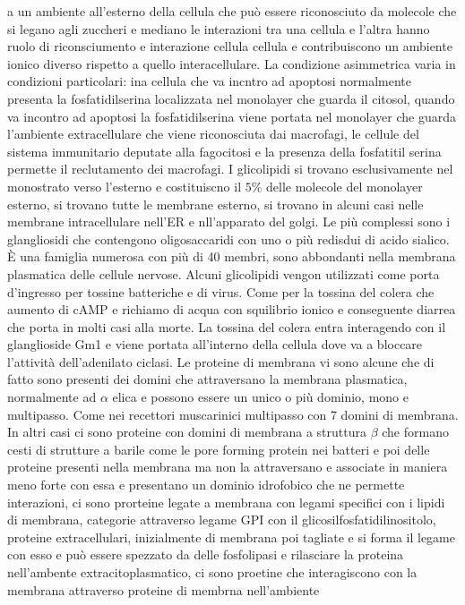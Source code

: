 a un ambiente all'esterno della cellula che pu\`o essere riconosciuto da molecole che si legano agli zuccheri e mediano le interazioni tra una cellula e l'altra hanno ruolo di 
riconsciumento e interazione cellula cellula e contribuiscono un ambiente ionico diverso rispetto a quello interacellulare. La condizione asimmetrica varia in condizioni particolari:
ina cellula che va incntro ad apoptosi normalmente presenta la fosfatidilserina localizzata nel monolayer che guarda il citosol, quando va incontro ad apoptosi la fosfatidilserina viene
portata nel monolayer che guarda l'ambiente extracellulare che viene riconosciuta dai macrofagi, le cellule del sistema immunitario deputate alla fagocitosi e la presenza della fosfatitil
serina permette il reclutamento dei macrofagi. I glicolipidi si trovano esclusivamente nel monostrato verso l'esterno e costituiscno il $5\%$ delle molecole del monolayer esterno, si 
trovano tutte le membrane esterno, si trovano in alcuni casi nelle membrane intracellulare nell'ER e nll'apparato del golgi. Le pi\`u complessi sono i glangliosidi che contengono 
oligosaccaridi con uno o pi\`u redisdui di acido sialico. \`E una famiglia numerosa con pi\`u di 40 membri, sono abbondanti nella membrana plasmatica delle cellule nervose. Alcuni 
glicolipidi vengon utilizzati come porta d'ingresso per tossine batteriche e di virus. Come per la tossina del colera che aumento di cAMP e richiamo di acqua con squilibrio ionico e 
conseguente diarrea che porta in molti casi alla morte. La tossina del colera entra interagendo con il glanglioside Gm1 e viene portata all'interno della cellula dove va a bloccare 
l'attivit\`a dell'adenilato ciclasi. Le proteine di membrana vi sono alcune che di fatto sono presenti dei domini che attraversano la membrana plasmatica, normalmente ad $\alpha$ elica
e possono essere un unico o pi\`u dominio, mono e multipasso. Come nei recettori muscarinici multipasso con 7 domini di membrana. In altri casi ci sono proteine con domini di membrana
a struttura $\beta$ che formano cesti di strutture a barile come le pore forming protein nei batteri e poi delle proteine presenti nella membrana ma non la attraversano e associate
in maniera meno forte con essa e presentano un dominio idrofobico che ne permette interazioni, ci sono prorteine legate a membrana con legami specifici con i lipidi di membrana, 
categorie attraverso legame GPI con il glicosilfosfatidilinositolo, proteine extracellulari, inizialmente di membrana poi tagliate e si forma il legame con esso e pu\`o essere spezzato
da delle fosfolipasi e rilasciare la proteina nell'ambente extracitoplasmatico, ci sono proetine che interagiscono con la membrana attraverso proteine di membrna nell'ambiente
